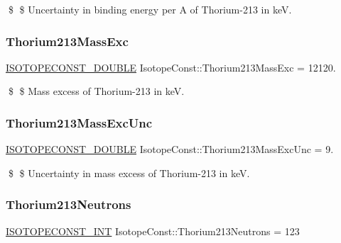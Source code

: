 \$ \$ Uncertainty in binding energy per A of Thorium-\/213 in keV. \mbox{\label{group___isotope_const-_thorium-_th213_ga90638a54fe1fe2c54276c138c6b7afc3}} 
\subsubsection{\texorpdfstring{Thorium213\+Mass\+Exc}{Thorium213MassExc}}
{\footnotesize\ttfamily \mbox{\hyperlink{group___isotope_const-_macros_ga8f45a7272ce02c0b4c65c44636ed719a}{I\+S\+O\+T\+O\+P\+E\+C\+O\+N\+S\+T\+\_\+\+D\+O\+U\+B\+LE}} Isotope\+Const\+::\+Thorium213\+Mass\+Exc = 12120.}

\$ \$ Mass excess of Thorium-\/213 in keV. \mbox{\label{group___isotope_const-_thorium-_th213_ga61ae7e0486e131d114437c3d967380f4}} 
\subsubsection{\texorpdfstring{Thorium213\+Mass\+Exc\+Unc}{Thorium213MassExcUnc}}
{\footnotesize\ttfamily \mbox{\hyperlink{group___isotope_const-_macros_ga8f45a7272ce02c0b4c65c44636ed719a}{I\+S\+O\+T\+O\+P\+E\+C\+O\+N\+S\+T\+\_\+\+D\+O\+U\+B\+LE}} Isotope\+Const\+::\+Thorium213\+Mass\+Exc\+Unc = 9.}

\$ \$ Uncertainty in mass excess of Thorium-\/213 in keV. \mbox{\label{group___isotope_const-_thorium-_th213_gae3f2e5d4a015077c38a4fce2730cadbd}} 
\subsubsection{\texorpdfstring{Thorium213\+Neutrons}{Thorium213Neutrons}}
{\footnotesize\ttfamily \mbox{\hyperlink{group___isotope_const-_macros_ga5f18360b3e99483a35c32d789e62621c}{I\+S\+O\+T\+O\+P\+E\+C\+O\+N\+S\+T\+\_\+\+I\+NT}} Isotope\+Const\+::\+Thorium213\+Neutrons = 123}

